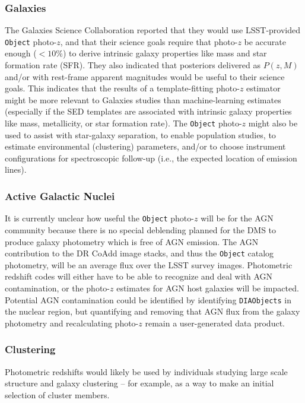 \documentclass[DM,lsstdraft,toc]{lsstdoc}
\begin{document}
\subsubsection{Galaxies}
The Galaxies Science Collaboration reported that they would use LSST-provided {\tt Object} photo-$z$, and that their science goals require that photo-$z$ be accurate enough ($<10\%$) to derive intrinsic galaxy properties like mass and star formation rate (SFR).
They also indicated that posteriors delivered as $P(z,M)$ and/or with rest-frame apparent magnitudes would be useful to their science goals.
This indicates that the results of a template-fitting photo-$z$ estimator might be more relevant to Galaxies studies than machine-learning estimates (especially if the SED templates are associated with intrinsic galaxy properties like mass, metallicity, or star formation rate).
The {\tt Object} photo-$z$ might also be used to assist with star-galaxy separation, to enable population studies, to estimate environmental (clustering) parameters, and/or to choose instrument configurations for spectroscopic follow-up (i.e., the expected location of emission lines).

\subsubsection{Active Galactic Nuclei}
It is currently unclear how useful the {\tt Object} photo-$z$ will be for the AGN community because there is no special deblending planned for the DMS to produce galaxy photometry which is free of AGN emission.
The AGN contribution to the DR CoAdd image stacks, and thus the {\tt Object} catalog photometry, will be an average flux over the LSST survey images.
Photometric redshift codes will either have to be able to recognize and deal with AGN contamination, or the photo-$z$ estimates for AGN host galaxies will be impacted.
Potential AGN contamination could be identified by identifying {\tt DIAObjects} in the nuclear region, but quantifying and removing that AGN flux from the galaxy photometry and recalculating photo-$z$ remain a user-generated data product.

\subsubsection{Clustering}
Photometric redshifts would likely be used by individuals studying large scale structure and galaxy clustering -- for example, as a way to make an initial selection of cluster members.
\end{document}
